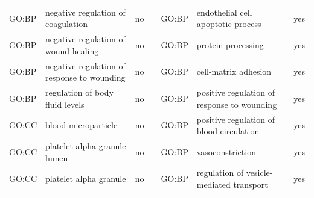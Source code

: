 \begin{longtable}{@{}lp{5cm}lllp{5cm}l@{}}
GO:BP           & negative regulation of coagulation                                                                                                 & no               &           & GO:BP           & endothelial cell apoptotic process                                                                                                                                     & yes              \\
GO:BP           & negative regulation of wound healing                                                                                               & no               &           & GO:BP           & protein processing                                                                                                                                                     & yes              \\
GO:BP           & negative regulation of response to wounding                                                                                        & no               &           & GO:BP           & cell-matrix adhesion                                                                                                                                                   & yes              \\
GO:BP           & regulation of body fluid levels                                                                                                    & no               &           & GO:BP           & positive regulation of response to wounding                                                                                                                            & yes              \\
GO:CC           & blood microparticle                                                                                                                & no               &           & GO:BP           & positive regulation of blood circulation                                                                                                                               & yes              \\
GO:CC           & platelet alpha granule lumen                                                                                                       & no               &           & GO:BP           & vasoconstriction                                                                                                                                                       & yes              \\
GO:CC           & platelet alpha granule                                                                                                             & no               &           & GO:BP           & regulation of vesicle-mediated transport                                                                                                                               & yes              \\

\end{longtable}
